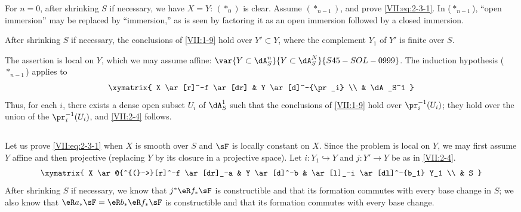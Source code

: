 For $n=0$, after shrinking $S$ if necessary, we have $X=Y$: $(\ast_0)$ is
clear. Assume $(\ast_{n-1})$, and prove \eqref{VII:eq:2-3-1}. In
($\ast_{n-1}$), ``open immersion'' may be replaced by ``immersion,'' as is
seen by factoring it as an open immersion followed by a closed immersion.





\begin{lemma_}\label{VII:2-4}
After shrinking $S$ if necessary, the conclusions of \ref{VII:1-9} hold over
$Y'\subset Y$, where the complement $Y_1$ of $Y'$ is finite over $S$.
\end{lemma_}

The assertion is local on $Y$, which we may assume affine:
$\var{Y\subset \dA_S^n}{Y\subset \dA_S^N}{S45-SOL-0999}$. The induction hypothesis ($\ast_{n-1}$) applies to
\[\xymatrix{
  X \ar[r]^-f \ar[dr] 
    & Y \ar[d]^-{\pr_i} \\
  & \dA_S^1 
}\]
Thus, for each $i$, there exists a dense open subset $U_i$ of $\dA_S^1$ such
that the conclusions of \ref{VII:1-9} hold over $\pr_i^{-1}(U_i)$; they hold
over the union of the $\pr_i^{-1}(U_i)$, and \ref{VII:2-4} follows.





\addtocounter{subsection}{1} %
\subsection{}\label{VII:2-6}

Let us prove \eqref{VII:eq:2-3-1} when $X$ is smooth over $S$ and $\sF$ is
locally constant on $X$. Since the problem is local on $Y$, we may first
assume $Y$ affine and then projective (replacing $Y$ by its closure in a
projective space). Let $i:Y_1\hookrightarrow Y$ and $j:Y' \to Y$ be as in
\ref{VII:2-4}.
\[\xymatrix{
  X \ar@{^{(}->}[r]^-f \ar[dr]_-a 
    & Y \ar[d]^-b 
    & \ar[l]_-i \ar[dl]^-{b_1} Y_1 \\
  & S 
}\] 
After shrinking $S$ if necessary, we know that $j^\ast \eR f_\ast \sF$ is
constructible and that its formation commutes with every base change in $S$;
we also know that $\eR a_\ast \sF = \eR b_\ast \eR f_\ast \sF$ is
constructible and that its formation commutes with every base change.

